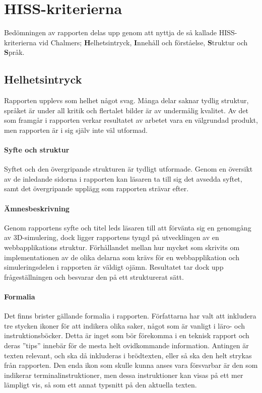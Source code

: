 \section{HISS-kriterierna} %
\label{sec:hiss}
    Bedömningen av rapporten delas upp genom att nyttja de så kallade HISS-kriterierna vid Chalmers; \textbf{H}elhetsintryck, \textbf{I}nnehåll och förståelse, \textbf{S}truktur och \textbf{S}pråk.

    \subsection{Helhetsintryck} %
    \label{sub:helhetsintryck}
        Rapporten upplevs som helhet något svag. Många delar saknar tydlig struktur, språket är under all kritik och flertalet bilder är av undermålig kvalitet. Av det som framgår i rapporten verkar resultatet av arbetet vara en välgrundad produkt, men rapporten är i sig själv inte väl utformad.

        \paragraph{Syfte och struktur}
            Syftet och den övergripande strukturen är tydligt utformade. Genom en översikt av de inledande sidorna i rapporten kan läsaren ta till sig det avsedda syftet, samt det övergripande upplägg som rapporten strävar efter.

        \paragraph{Ämnesbeskrivning}
            Genom rapportens syfte och titel leds läsaren till att förvänta sig en genomgång av 3D-simulering, dock ligger rapportens tyngd på utvecklingen av en webbapplikations struktur. Förhållandet mellan hur mycket som skrivits om implementationen av de olika delarna som krävs för en webbapplikation och simuleringsdelen i rapporten är väldigt ojämn. Resultatet tar dock upp frågeställningen och besvarar den på ett strukturerat sätt.

        \paragraph{Formalia}
            Det finns brister gällande formalia i rapporten. Författarna har valt att inkludera tre stycken ikoner för att indikera olika saker, något som är vanligt i läro- och instruktionsböcker. Detta är inget som bör förekomma i en teknisk rapport och deras ''tips'' innebär för de mesta helt ovidkommande information. Antingen är texten relevant, och ska då inkluderas i brödtexten, eller så ska den helt strykas från rapporten. Den enda ikon som skulle kunna anses vara försvarbar är den som indikerar terminalinstruktioner, men dessa instruktioner kan visas på ett mer lämpligt vis, så som ett annat typsnitt på den aktuella texten.

